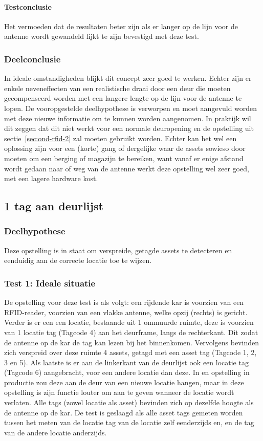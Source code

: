 \paragraph{Testconclusie}
Het vermoeden dat de resultaten beter zijn als er langer op de lijn voor de antenne wordt gewandeld lijkt te zijn bevestigd met deze test.

\subsubsection{Deelconclusie}
In ideale omstandigheden blijkt dit concept zeer goed te werken. Echter zijn er enkele neveneffecten van een realistische draai door een deur die moeten gecompenseerd worden met een langere lengte op de lijn voor de antenne te lopen. De vooropgestelde deelhypothese is verworpen en moet aangevuld worden met deze nieuwe informatie om te kunnen worden aangenomen. In praktijk wil dit zeggen dat dit niet werkt voor een normale deuropening en de opstelling uit sectie~\ref{sec:ond-rfid-2} zal moeten gebruikt worden. Echter kan het wel een oplossing zijn voor een (korte) gang of dergelijke waar de assets sowieso door moeten om een berging of magazijn te bereiken, want vanaf er enige afstand wordt gedaan naar of weg van de antenne werkt deze opstelling wel zeer goed, met een lagere hardware kost. 

\subsection{1 tag aan deurlijst}
\label{sec:ond-rfid-4}
\subsubsection{Deelhypothese}
Deze opstelling is in staat om verspreide, getagde assets te detecteren en eenduidig aan de correcte locatie toe te wijzen.

\subsubsection{Test 1: Ideale situatie}
\label{sec:ond-rfid-4-1}
De opstelling voor deze test is als volgt: een rijdende kar is voorzien van een RFID-reader, voorzien van een vlakke antenne, welke opzij (rechts) is gericht. Verder is er een een locatie, bestaande uit 1 ommuurde ruimte, deze is voorzien van 1 locatie tag (Tagcode 4) aan het deurframe, langs de rechterkant. Dit zodat de antenne op de kar de tag kan lezen bij het binnenkomen. Vervolgens bevinden zich verspreid over deze ruimte 4 assets, getagd met een asset tag (Tagcode 1, 2, 3 en 5). Als laatste is er aan de linkerkant van de deurlijst ook een locatie tag (Tagcode 6) aangebracht, voor een andere locatie dan deze. In en opstelling in productie zou deze aan de deur van een nieuwe locatie hangen, maar in deze opstelling is zijn functie louter om aan te geven wanneer de locatie wordt verlaten. Alle tags (zowel locatie als asset) bevinden zich op dezelfde hoogte als de antenne op de kar. De test is geslaagd als alle asset tags gemeten worden tussen het meten van de locatie tag van de locatie zelf eenderzijds en, en de tag van de andere locatie anderzijds.

